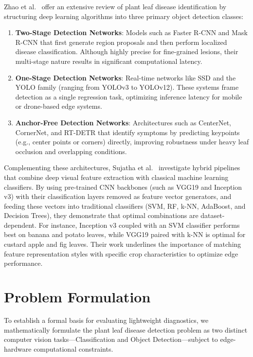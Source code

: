 \documentclass[10pt, conference]{IEEEtran}
\begin{document}
Zhao et al.~\cite{zhao2025} offer an extensive review of plant leaf disease identification by structuring deep learning algorithms into three primary object detection classes:
\begin{enumerate}
    \item \textbf{Two-Stage Detection Networks}: Models such as Faster R-CNN and Mask R-CNN that first generate region proposals and then perform localized disease classification. Although highly precise for fine-grained lesions, their multi-stage nature results in significant computational latency.
    \item \textbf{One-Stage Detection Networks}: Real-time networks like SSD and the YOLO family (ranging from YOLOv3 to YOLOv12). These systems frame detection as a single regression task, optimizing inference latency for mobile or drone-based edge systems.
    \item \textbf{Anchor-Free Detection Networks}: Architectures such as CenterNet, CornerNet, and RT-DETR that identify symptoms by predicting keypoints (e.g., center points or corners) directly, improving robustness under heavy leaf occlusion and overlapping conditions.
\end{enumerate}

Complementing these architectures, Sujatha et al.~\cite{sujatha2025} investigate hybrid pipelines that combine deep visual feature extraction with classical machine learning classifiers. By using pre-trained CNN backbones (such as VGG19 and Inception v3) with their classification layers removed as feature vector generators, and feeding these vectors into traditional classifiers (SVM, RF, k-NN, AdaBoost, and Decision Trees), they demonstrate that optimal combinations are dataset-dependent. For instance, Inception v3 coupled with an SVM classifier performs best on banana and potato leaves, while VGG19 paired with k-NN is optimal for custard apple and fig leaves. Their work underlines the importance of matching feature representation styles with specific crop characteristics to optimize edge performance.

\section{Problem Formulation}
\label{sec:problem}

To establish a formal basis for evaluating lightweight diagnostics, we mathematically formulate the plant leaf disease detection problem as two distinct computer vision tasks—Classification and Object Detection—subject to edge-hardware computational constraints.
\end{document}
